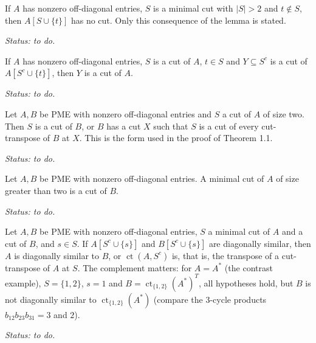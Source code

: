 \begin{lemma}
\label{lem:cggr33}
\leanok
{}
If $A$ has nonzero off-diagonal entries, $S$ is a minimal cut with $|S|>2$ and $t\notin S$,
then $A[S\cup\{t\}]$ has no cut. Only this consequence of the lemma is stated.
\end{lemma}
\noindent\emph{Status: to do.}

\begin{lemma}
\label{lem:cggr34}
\leanok
{}
If $A$ has nonzero off-diagonal entries, $S$ is a cut of $A$, $t\in S$ and $Y\subseteq S^c$
is a cut of $A[S^c\cup\{t\}]$, then $Y$ is a cut of $A$.
\end{lemma}
\noindent\emph{Status: to do.}

\begin{lemma}
\label{lem:cggr35}
\leanok
{}
Let $A,B$ be PME with nonzero off-diagonal entries and $S$ a cut of $A$ of size two.
Then $S$ is a cut of $B$, or $B$ has a cut $X$ such that $S$ is a cut of every
cut-transpose of $B$ at $X$. This is the form used in the proof of Theorem 1.1.
\end{lemma}
\noindent\emph{Status: to do.}

\begin{lemma}
\label{lem:cggr36}
\leanok
{}
Let $A,B$ be PME with nonzero off-diagonal entries. A minimal cut of $A$ of size greater
than two is a cut of $B$.
\end{lemma}
\noindent\emph{Status: to do.}

\begin{lemma}
\label{lem:cggr39}
\leanok
{}
Let $A,B$ be PME with nonzero off-diagonal entries, $S$ a minimal cut of $A$ and a cut of
$B$, and $s\in S$. If $A[S^c\cup\{s\}]$ and $B[S^c\cup\{s\}]$ are diagonally similar, then
$A$ is diagonally similar to $B$, or $\operatorname{ct}(A,S^c)$ is, that is, the transpose
of a cut-transpose of $A$ at $S$. The complement matters: for $A=A^*$ (the contrast example),
$S=\{1,2\}$, $s=1$ and $B=\operatorname{ct}_{\{1,2\}}(A^*)^T$, all hypotheses hold, but $B$ is
not diagonally similar to $\operatorname{ct}_{\{1,2\}}(A^*)$ (compare the 3-cycle products
$b_{12}b_{23}b_{31}=3$ and $2$).
\end{lemma}
\noindent\emph{Status: to do.}

